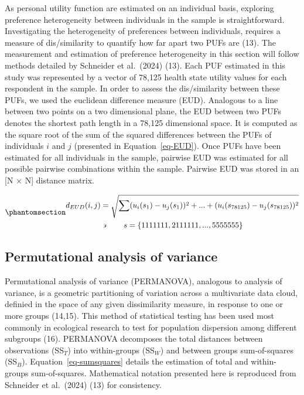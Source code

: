 \documentclass[
  letterpaper,
  DIV=11,
  numbers=noendperiod]{scrartcl}
\begin{document}
As personal utility function are estimated on an individual basis,
exploring preference heterogeneity between individuals in the sample is
straightforward. Investigating the heterogeneity of preferences between
individuals, requires a measure of dis/similarity to quantify how far
apart two PUFs are (13). The measurement and estimation of preference
heterogeneity in this section will follow methods detailed by Schneider
et al.~(2024) (13). Each PUF estimated in this study was represented by
a vector of 78,125 health state utility values for each respondent in
the sample. In order to assess the dis/similarity between these PUFs, we
used the euclidean difference measure (EUD). Analogous to a line between
two points on a two dimensional plane, the EUD between two PUFs denotes
the shortest path length in a 78,125 dimensional space. It is computed
as the square root of the sum of the squared differences between the
PUFs of individuals \(i\) and \(j\) (presented in
Equation~\ref{eq-EUD}). Once PUFs have been estimated for all
individuals in the sample, pairwise EUD was estimated for all possible
pairwise combinations within the sample. Pairwise EUD was stored in an
{[}N \(\times\) N{]} distance matrix.

\begin{equation}\phantomsection\label{eq-EUD}{ 
  \begin{aligned}
    d_{EUD}(i,j) & =\sqrt{\sum_{}^{}(u_{i}(s_{1})-u_{j}(s_{1}))^{2}+ ... +(u_{i}(s_{78125})-u_{j}(s_{78125}))^{2}}\\
      & \backepsilon \quad \quad s = \{1111111, 2111111, ..., 5555555\}\\
  \end{aligned}
}\end{equation}

\subsection{Permutational analysis of
variance}\label{permutational-analysis-of-variance}

Permutational analysis of variance (PERMANOVA), analogous to analysis of
variance, is a geometric partitioning of variation across a multivariate
data cloud, definied in the space of any given dissimilarity measure, in
response to one or more groups (14,15). This method of statistical
testing has been used most commonly in ecological research to test for
population dispersion among different subgroups (16). PERMANOVA
decomposes the total distances between observations (SS\(_T\)) into
within-groups (SS\(_W\)) and between groups sum-of-squares (SS\(_B\)).
Equation~\ref{eq-sumsquares} details the estimation of total and
within-groups sum-of-squares. Mathematical notation presented here is
reproduced from Schneider et al.~(2024) (13) for consistency.
\end{document}
